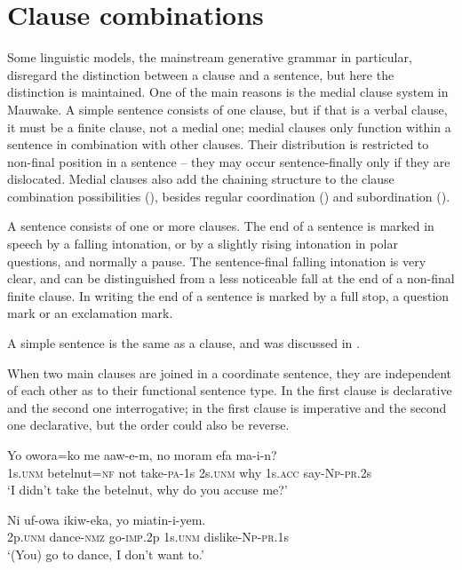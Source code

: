 
\chapter{Clause combinations}

Some linguistic models, the mainstream generative grammar in particular, disregard the distinction between a clause and a sentence, but here the distinction is maintained. One of the main reasons is the medial clause system in Mauwake.  A simple sentence consists of one clause, but if that is a verbal clause, it must be a finite clause, not a medial one; medial clauses only function within a sentence in combination with other clauses. Their distribution is restricted to non-final position in a sentence -- they may occur sentence-finally only if they are dislocated. Medial clauses also add the chaining structure to the clause combination possibilities (), besides regular coordination () and subordination (). 

A sentence consists of one or more clauses. The end of a sentence is marked in speech by a falling intonation, or by a slightly rising intonation in polar questions, and normally a pause. The sentence-final falling intonation is very clear, and can be distinguished from a less noticeable fall at the end of a non-final finite clause. In writing the end of a sentence is marked by a full stop, a question mark or an exclamation mark.

A simple sentence is the same as a clause, and was discussed in .

When two main clauses are joined in a coordinate sentence, they are independent of each other as to their functional sentence type. In  the first clause is declarative and the second one interrogative; in  the first clause is imperative and the second one declarative, but the order could also be reverse. 

\ea%
\label{ex:8:x1352}
\gll Yo  owora=ko  me  aaw-e-m,  no  moram  efa ma-i-n?\\
1s.\textsc{unm}  betelnut=\textsc{nf}  not  take-\textsc{pa}-1s  2s.\textsc{unm}  why  1s.\textsc{acc} say-\textsc{Np}-\textsc{pr}.2s\\
\glt `I didn't take the betelnut, why do you accuse me?'
\z


\ea%
\label{ex:8:x1358}
\gll Ni  uf-owa  ikiw-eka,  yo  miatin-i-yem. \\
2p.\textsc{unm}  dance-\textsc{nmz}  go-\textsc{imp}.2p  1s.\textsc{unm}  dislike-\textsc{Np}-\textsc{pr}.1s\\
\glt `(You) go to dance, I don't want to.'
\z

